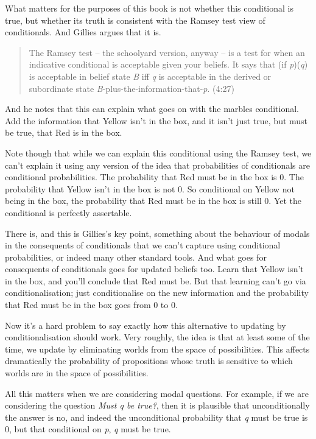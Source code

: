 \documentclass[
  10pt,
  letterpaper,
  twoside]{scrbook}
\begin{document}
What matters for the purposes of this book is not whether this
conditional is true, but whether its truth is consistent with the Ramsey
test view of conditionals. And Gillies argues that it is.

\begin{quote}
The Ramsey test -- the schoolyard version, anyway -- is a test for when
an indicative conditional is acceptable given your beliefs. It says that
(if \emph{p})(\emph{q}) is acceptable in belief state \emph{B} iff
\emph{q} is acceptable in the derived or subordinate state
\emph{B}-plus-the-information-that-\emph{p}. (4:27)
\end{quote}

And he notes that this can explain what goes on with the marbles
conditional. Add the information that Yellow isn't in the box, and it
isn't just true, but must be true, that Red is in the box.

Note though that while we can explain this conditional using the Ramsey
test, we can't explain it using any version of the idea that
probabilities of conditionals are conditional probabilities. The
probability that Red must be in the box is 0. The probability that
Yellow isn't in the box is not 0. So conditional on Yellow not being in
the box, the probability that Red must be in the box is still 0. Yet the
conditional is perfectly assertable.

There is, and this is Gillies's key point, something about the behaviour
of modals in the consequents of conditionals that we can't capture using
conditional probabilities, or indeed many other standard tools. And what
goes for consequents of conditionals goes for updated beliefs too. Learn
that Yellow isn't in the box, and you'll conclude that Red must be. But
that learning can't go via conditionalisation; just conditionalise on
the new information and the probability that Red must be in the box goes
from 0 to 0.

Now it's a hard problem to say exactly how this alternative to updating
by conditionalisation should work. Very roughly, the idea is that at
least some of the time, we update by eliminating worlds from the space
of possibilities. This affects dramatically the probability of
propositions whose truth is sensitive to which worlds are in the space
of possibilities.

All this matters when we are considering modal questions. For example,
if we are considering the question \emph{Must q be true?}, then it is
plausible that unconditionally the answer is no, and indeed the
unconditional probability that \emph{q} must be true is 0, but that
conditional on \emph{p}, \emph{q} must be true.
\end{document}
